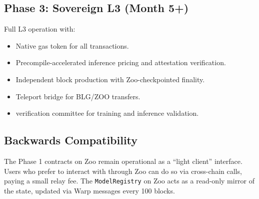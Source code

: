 \subsection{Phase 3: Sovereign L3 (Month 5+)}

Full L3 operation with:

\begin{itemize}[nosep]
    \item Native \BLG{} gas token for all transactions.
    \item Precompile-accelerated inference pricing and attestation verification.
    \item Independent block production with Zoo-checkpointed finality.
    \item Teleport bridge for BLG/ZOO transfers.
    \item \PoAI{} verification committee for training and inference validation.
\end{itemize}

\subsection{Backwards Compatibility}

The Phase 1 contracts on Zoo remain operational as a ``light client'' interface. Users who prefer to interact with \Beluga{} through Zoo can do so via cross-chain calls, paying a small relay fee. The \texttt{ModelRegistry} on Zoo acts as a read-only mirror of the \Beluga{} state, updated via Warp messages every 100 blocks.


